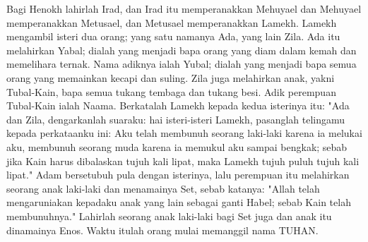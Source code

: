 \begin{biblechapter}
\verse Bagi Henokh lahirlah Irad, dan Irad itu memperanakkan Mehuyael dan Mehuyael memperanakkan Metusael, dan Metusael memperanakkan Lamekh.
\verse Lamekh mengambil isteri dua orang; yang satu namanya Ada, yang lain Zila.
\verse Ada itu melahirkan Yabal; dialah yang menjadi bapa orang yang diam dalam kemah dan memelihara ternak.
\verse Nama adiknya ialah Yubal; dialah yang menjadi bapa semua orang yang memainkan kecapi dan suling.
\verse Zila juga melahirkan anak, yakni Tubal-Kain, bapa semua tukang tembaga dan tukang besi. Adik perempuan Tubal-Kain ialah Naama.
\verse Berkatalah Lamekh kepada kedua isterinya itu: "Ada dan Zila, dengarkanlah suaraku: hai isteri-isteri Lamekh, pasanglah telingamu kepada perkataanku ini: Aku telah membunuh seorang laki-laki karena ia melukai aku, membunuh seorang muda karena ia memukul aku sampai bengkak;
\verse sebab jika Kain harus dibalaskan tujuh kali lipat, maka Lamekh tujuh puluh tujuh kali lipat."
\verse Adam bersetubuh pula dengan isterinya, lalu perempuan itu melahirkan seorang anak laki-laki dan menamainya Set, sebab katanya: "Allah telah mengaruniakan kepadaku anak yang lain sebagai ganti Habel; sebab Kain telah membunuhnya."
\verse Lahirlah seorang anak laki-laki bagi Set juga dan anak itu dinamainya Enos. Waktu itulah orang mulai memanggil nama TUHAN.
\end{biblechapter}

